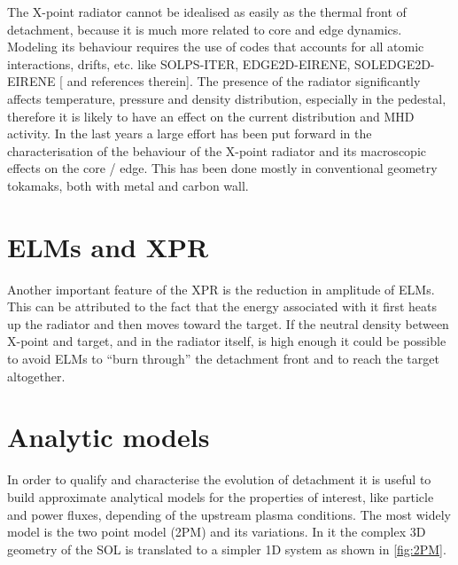 The X-point radiator cannot be idealised as easily as the thermal front of detachment, because it is much more related to core and edge dynamics. Modeling its behaviour requires the use of codes that accounts for all atomic interactions, drifts, etc. like SOLPS-ITER, EDGE2D-EIRENE, SOLEDGE2D-EIRENE [\cite{Wiesen2017a} and references therein]. The presence of the radiator significantly affects temperature, pressure and density distribution, especially in the pedestal, therefore it is likely to have an effect on the current distribution and MHD activity.
In the last years a large effort has been put forward in the characterisation of the behaviour of the X-point radiator and its macroscopic effects on the core / edge. This has been done mostly in conventional geometry tokamaks, both with metal and carbon wall.


\section{ELMs and XPR}
Another important feature of the XPR is the reduction in amplitude of ELMs. This can be attributed to the fact that the energy associated with it first heats up the radiator and then moves toward the target. If the neutral density between X-point and target, and in the radiator itself, is high enough it could be possible to avoid ELMs to “burn through” the detachment front and to reach the target altogether. \cite{Krasheninnikov2016}



\section{Analytic models}\label{Analytic models}

In order to qualify and characterise the evolution of detachment it is useful to build approximate analytical models for the properties of interest, like particle and power fluxes, depending of the upstream plasma conditions. The most widely model is the two point model (2PM) and its variations.\cite{Stangeby2001} In it the complex 3D geometry of the SOL is translated to a simpler 1D system as shown in \autoref{fig:2PM}.


